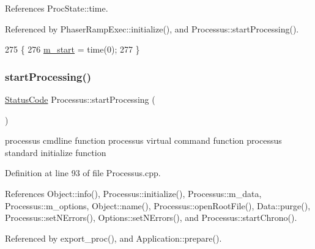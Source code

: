 References Proc\+State\+::time.



Referenced by Phaser\+Ramp\+Exec\+::initialize(), and Processus\+::start\+Processing().


\begin{DoxyCode}
275                     \{
276     \hyperlink{classProcessus_a8ec00b2e12c5beada932610f30218e93}{m\_start} = time(0);
277   \}
\end{DoxyCode}
\mbox{\label{classProcessus_a09319bde9bed93e290f69b4e04585543}} 
\subsubsection{\texorpdfstring{start\+Processing()}{startProcessing()}}
{\footnotesize\ttfamily \hyperlink{classStatusCode}{Status\+Code} Processus\+::start\+Processing (\begin{DoxyParamCaption}{ }\end{DoxyParamCaption})\hspace{0.3cm}{\ttfamily [inherited]}}

processus cmdline function processus virtual command function processus standard initialize function 

Definition at line 93 of file Processus.\+cpp.



References Object\+::info(), Processus\+::initialize(), Processus\+::m\+\_\+data, Processus\+::m\+\_\+options, Object\+::name(), Processus\+::open\+Root\+File(), Data\+::purge(), Processus\+::set\+N\+Errors(), Options\+::set\+N\+Errors(), and Processus\+::start\+Chrono().



Referenced by export\+\_\+proc(), and Application\+::prepare().


